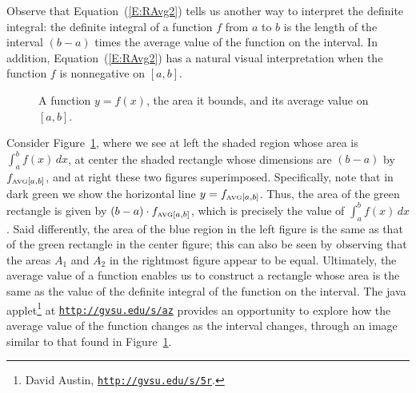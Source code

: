 Observe that Equation~(\ref{E:RAvg2}) tells us another way to interpret the definite integral:  the definite integral of a function $f$ from $a$ to $b$ is the length of the interval $(b-a)$ times the average value of the function on the interval.  In addition, Equation~(\ref{E:RAvg2}) has a natural visual interpretation when the function $f$ is nonnegative on $[a,b]$.  
\begin{figure}[h]
\begin{center}
\caption{A function $y = f(x)$, the area it bounds, and its average value on $[a,b]$.} \label{F:4.3.AvgVal}
\end{center}
\end{figure}
Consider Figure~\ref{F:4.3.AvgVal}, where we see at left the shaded region whose area is $\int_a^b f(x) \, dx$, at center the shaded rectangle whose dimensions are $(b-a)$ by $f_{\mbox{\tiny{AVG}}[a,b]}$, and at right these two figures superimposed.  Specifically, note that in dark green we show the horizontal line $y = f_{\mbox{\tiny{AVG}}[a,b]}$.  Thus, the area of the green rectangle is given by $(b-a) \cdot f_{\mbox{\tiny{AVG}}[a,b]}$, which is precisely the value of $\int_a^b f(x) \, dx$.  Said differently, the area of the blue region in the left figure is the same as that of the green rectangle in the center figure; this can also be seen by observing that the areas $A_1$ and $A_2$ in the rightmost figure appear to be equal.  Ultimately, the average value of a function enables us to construct a rectangle whose area is the same as the value of the definite integral of the function on the interval.  The java applet\footnote{David Austin, \href{http://gvsu.edu/s/5r}{\texttt{http://gvsu.edu/s/5r}}.} at \href{http://gvsu.edu/s/az}{\texttt{http://gvsu.edu/s/az}} provides an opportunity to explore how the average value of the function changes as the interval changes, through an image similar to that found in Figure~\ref{F:4.3.AvgVal}.



